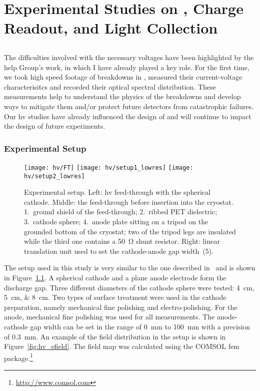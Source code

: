 \chapter{Experimental Studies on , Charge Readout, and Light Collection}
\label{chap:studies}


\section{}
\label{sec:studies_hv}

The difficulties involved with the necessary voltages have been highlighted by the \gls{help} Group’s work, in which I have already played a key role\cite{breakdown_16}.
For the first time, we took high speed footage of breakdowns in \lar{}, measured their current-voltage characterisitcs and recorded their optical spectral distribution.
These measurements help to understand the physics of the breakdowns and develop ways to mitigate them and/or protect future detectors from catastrophic failures.
Our \gls{hv} studies have already influenced the design of \uboone{} and will continue to impact the design of future experiments.


\subsection{Experimental Setup}
\label{sec:studies_hv_setup}

\begin{figure}[htb]
	\centering	
	\texttt{[image: hv/FT]}
	\texttt{[image: hv/setup1\_lowres]}
	\texttt{[image: hv/setup2\_lowres]}
	\caption{Experimental setup. Left: \gls{hv} feed-through with the spherical cathode. Middle: the feed-through before insertion into the cryostat. 1.~ground shield of the feed-through; 2.~ribbed PET dielectric; 3.~cathode sphere; 4.~anode plate sitting on a tripod on the grounded bottom of the cryostat; two of the tripod legs are insulated while the third one contains a \SI{50}{\ohm} shunt resistor. Right: linear translation unit used to set the cathode-anode gap width~(5).}
	\label{fig:hv_setup1}
\end{figure}

The setup used in this study is very similar to the one described in~\cite{breakdown_14} and is shown in Figure~\ref{fig:hv_setup1}.
A spherical cathode and a plane anode electrode form the discharge gap.
Three different diameters of the cathode sphere were tested: \SIlist{4; 5; 8}{\centi\metre}.
Two types of surface treatment were used in the cathode preparation, namely mechanical fine polishing and electro-polishing.
For the anode, mechanical fine polishing was used for all measurements.
The anode-cathode gap width can be set in the range of \SI{0}{\milli\metre} to \SI{100}{\milli\metre} with a precision of \SI{0.3}{\milli\metre}.
An example of the field distribution in the setup is shown in Figure~\ref{fig:hv_efield}.
The field map was calculated using the COMSOL \gls{fem} package.\footnote{\url{http://www.comsol.com}}

